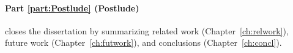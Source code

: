 \paragraph{Part \ref{part:Postlude} (Postlude)}\hspace{-1em} closes
the dissertation by summarizing
  related work (Chapter~\ref{ch:relwork}),
  future work (Chapter~\ref{ch:futwork}), and
  conclusions (Chapter~\ref{ch:concl}).

